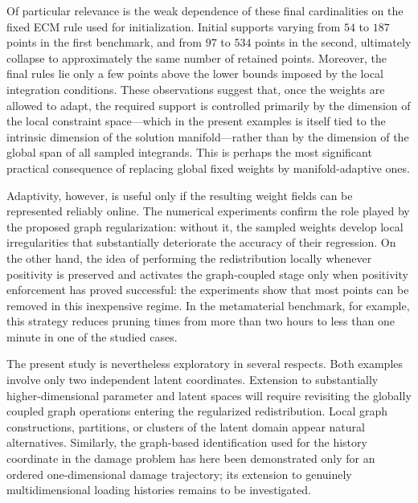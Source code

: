 \documentclass[preprint,10pt]{elsarticle}  %
\begin{document}
Of particular relevance is the weak dependence of these final
cardinalities on the fixed ECM rule used for initialization.  Initial supports
varying from \(54\) to \(187\) points in the first benchmark, and from
\(97\) to \(534\) points in the second, ultimately collapse to
approximately the same number of retained points. Moreover, the final
rules lie only a few points above the lower bounds imposed by the local
integration conditions. These observations suggest that, once the
weights are allowed to adapt, the required support is controlled
primarily by the dimension of the local constraint space---which in the
present examples is itself tied to the intrinsic dimension of the
solution manifold---rather than by the dimension of the global span of
all sampled integrands. This is perhaps the most significant practical
consequence of replacing global fixed weights by manifold-adaptive ones.




Adaptivity, however, is useful only if the resulting weight fields can
be represented reliably online. The numerical experiments confirm the
role played by the proposed graph regularization: without it, the sampled weights develop local
irregularities that substantially deteriorate the accuracy of their
regression.  On the other hand, the idea of  performing
the redistribution locally whenever positivity is preserved and
activates the graph-coupled stage only when positivity enforcement
has proved successful:  the experiments show that most points can be removed
in this inexpensive regime. In the metamaterial benchmark, for example,
this strategy reduces pruning times    from more than two hours
to less than one minute in one of the studied cases.


The present study is nevertheless exploratory in several respects.
Both examples involve only two independent latent coordinates. Extension
to substantially higher-dimensional parameter and latent spaces will
require revisiting the globally coupled graph operations entering the
regularized redistribution. Local graph constructions, partitions, or
clusters of the latent domain appear natural alternatives. Similarly,
the graph-based identification used for the history coordinate in
the damage problem has here been demonstrated only for an ordered
one-dimensional damage trajectory; its extension to genuinely
multidimensional loading histories remains to be investigated.
\end{document}
